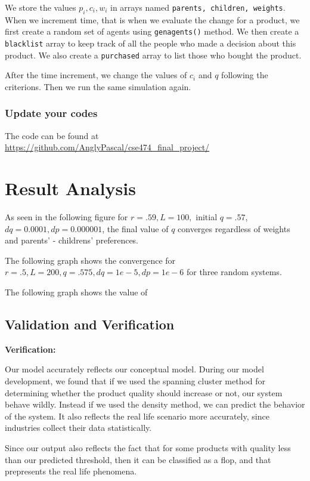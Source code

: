 \documentclass[article, 11pt, a4paper, onesize]{memoir}
\begin{document}
We store the values \(p_i, c_i, w_i\) in arrays named \texttt{parents, children, weights}.
When we increment time, that is when we evaluate the change for a product, we first create
a random set of agents using \texttt{gen\textunderscore agents()} method. We then create a
\texttt{blacklist} array to keep track of all the people who made a decision about this
product. We also create a \texttt{purchased} array to list those who bought the product. 

After the time increment, we change the values of \(c_i\) and \(q\) following the
criterions. Then we run the same simulation again.


\subsection{Update your codes}

The code can be found at \url{https://github.com/AnglyPascal/cse474_final_project/}


\chapter{Result Analysis}

As seen in the following figure for \(r=.59, L=100, \) initial \(q = .57\), \(dq = 0.0001,
dp = 0.000001\), the final value of \(q\) converges regardless of weights and parents' -
childrens' preferences. 


The following graph shows the convergence for \(r=.5, L=200, q=.575, dq =1e-5, dp=1e-6\)
for three random systems.


The following graph shows the value of 


\section{Validation and Verification}

\textbf{Verification:}

Our model accurately reflects our conceptual model. During our model development, we found
that if we used the spanning cluster method for determining whether the product quality
should increase or not, our system behave wildly. Instead if we used the density method,
we can predict the behavior of the system. It also reflects the real life scenario more
accurately, since industries collect their data statistically. 

Since our output also reflects the fact that for some products with quality less than our
predicted threshold, then it can be classified as a flop, and that prepresents the real
life phenomena.
\end{document}

